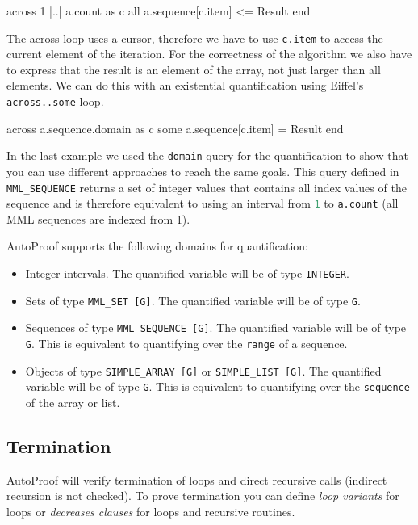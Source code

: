 \documentclass[a4paper,12pt]{article}
\newcommand{\AutoProof}{Auto\-Proof\xspace}
\newcommand{\e}[1]{\mbox{\lstinline[language=Eiffel]|#1|}}
\begin{document}
\begin{erunning}[numbers=none]
across 1 |..| a.count as c all a.sequence[c.item] <= Result end
\end{erunning}

The across loop uses a cursor, therefore we have to use \e{c.item} to access the current element of the iteration. For the correctness of the algorithm we also have to express that the result is an element of the array, not just larger than all elements. We can do this with an existential quantification using Eiffel's \e{across..some} loop.

\begin{erunning}[numbers=none]
across a.sequence.domain as c some a.sequence[c.item] = Result end
\end{erunning}

In the last example we used the \e{domain} query for the quantification to show that you can use different approaches to reach the same goals. This query defined in \e{MML_SEQUENCE} returns a set of integer values that contains all index values of the sequence and is therefore equivalent to using an interval from \e{1} to \e{a.count} (all MML sequences are indexed from 1).

\AutoProof supports the following domains for quantification:
\begin{itemize}
\item Integer intervals. The quantified variable will be of type \e{INTEGER}.
\item Sets of type \e{MML_SET [G]}. The quantified variable will be of type \e{G}.
\item Sequences of type \e{MML_SEQUENCE [G]}. The quantified variable will be of type \e{G}. This is equivalent to quantifying over the \e{range} of a sequence.
\item Objects of type \e{SIMPLE_ARRAY [G]} or \e{SIMPLE_LIST [G]}. The quantified variable will be of type \e{G}. This is equivalent to quantifying over the \e{sequence} of the array or list.
\end{itemize}

\subsection{Termination}

\AutoProof will verify termination of loops and direct recursive calls (indirect recursion is not checked). To prove termination you can define \emph{loop variants} for loops or \emph{decreases clauses} for loops and recursive routines.
\end{document}
